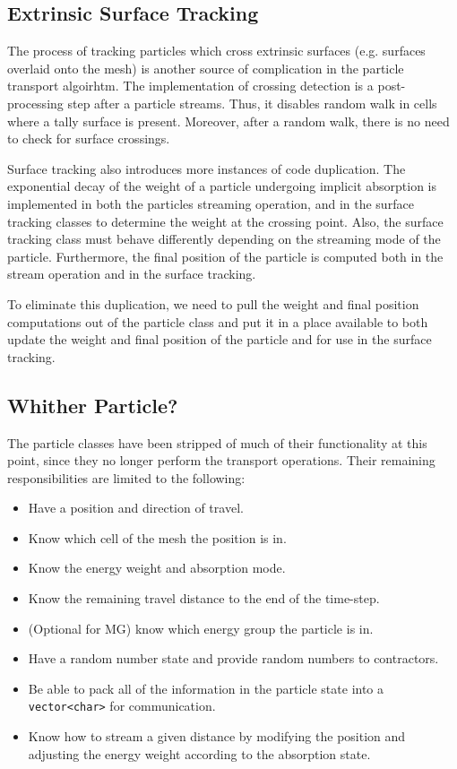 \documentclass[memo]{ResearchNote}
\begin{document}
\subsection{Extrinsic Surface Tracking} \label{sec:surface_tracking}

The process of tracking particles which cross extrinsic surfaces
(e.g. surfaces overlaid onto the mesh) is another source of
complication in the particle transport algoirhtm. The implementation
of crossing detection is a post-processing step after a particle
streams. Thus, it disables random walk in cells where a tally surface
is present. Moreover, after a random walk, there is no need to check
for surface crossings.

Surface tracking also introduces more instances of code duplication.
The exponential decay of the weight of a particle undergoing implicit
absorption is implemented in both the particles streaming operation,
and in the surface tracking classes to determine the weight at the
crossing point. Also, the surface tracking class must behave
differently depending on the streaming mode of the
particle. Furthermore, the final position of the particle is computed
both in the stream operation and in the surface tracking.

To eliminate this duplication, we need to pull the weight and final
position computations out of the particle class and put it in a place
available to both update the weight and final position of the particle
and for use in the surface tracking. 

\subsection{Whither Particle?}

The particle classes have been stripped of much of their functionality
at this point, since they no longer perform the transport
operations. Their remaining responsibilities are limited to the
following:
\begin{itemize}
  \item Have a position and direction of travel. 
  \item Know which cell of the mesh the position is in.
  \item Know the energy weight and absorption mode.
  \item Know the remaining travel distance to the end of the
    time-step.
  \item (Optional for MG) know which energy group the particle is in.
  \item Have a random number state and provide random numbers to
    contractors.
  \item Be able to pack all of the information in the particle state
    into a {\tt vector<char>} for communication.
  \item Know how to stream a given distance by modifying the position
    and adjusting the energy weight according to the absorption state.
\end{itemize}
\end{document}
